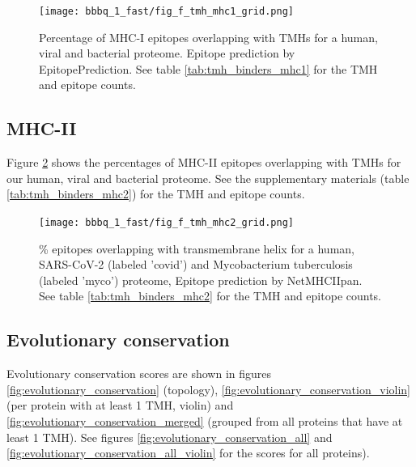
\begin{figure}[!htbp]
  \texttt{[image: bbbq\_1\_fast/fig\_f\_tmh\_mhc1\_grid.png]}
  \caption{
    Percentage of MHC-I epitopes overlapping with TMHs
    for a human, viral and bacterial proteome.
    Epitope prediction by EpitopePrediction.
    See table \ref{tab:tmh_binders_mhc1} for the TMH and epitope counts.
  }
  \label{fig:1}
\end{figure}

\subsection{MHC-II}

Figure \ref{fig:2} shows the percentages of MHC-II epitopes overlapping 
with TMHs for our human, viral and bacterial proteome.
See the supplementary materials (table \ref{tab:tmh_binders_mhc2}) 
for the TMH and epitope counts.

\begin{figure}[!htbp]
  \texttt{[image: bbbq\_1\_fast/fig\_f\_tmh\_mhc2\_grid.png]}
  \caption{
    \% epitopes overlapping with transmembrane helix
    for a human, SARS-CoV-2 (labeled 'covid') 
    and Mycobacterium tuberculosis (labeled 'myco') proteome,
    Epitope prediction by NetMHCIIpan.
    See table \ref{tab:tmh_binders_mhc2} for the TMH and epitope counts.
  }
  \label{fig:2}
\end{figure}

\subsection{Evolutionary conservation}

Evolutionary conservation scores are shown in 
figures \ref{fig:evolutionary_conservation} (topology),
\ref{fig:evolutionary_conservation_violin} (per 
protein with at least 1 TMH, violin)
and \ref{fig:evolutionary_conservation_merged} (grouped 
from all proteins that have at least 1 TMH).
See figures
\ref{fig:evolutionary_conservation_all} and 
\ref{fig:evolutionary_conservation_all_violin}
for the scores for all proteins).

